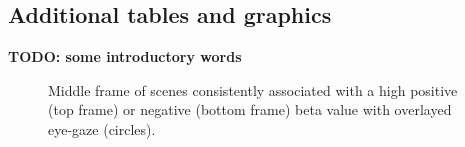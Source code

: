 \documentclass[a4paper, 12pt]{scrreprt}
\begin{document}
\begin{appendices}
	
\chapter{Additional tables and graphics}\label{A:addons}
\textbf{TODO: some introductory words}

\begin{figure}[H]
	\caption[Descriptive analysis of diagnostic scenes]{\small{Middle frame of scenes consistently associated with a high positive (top frame) or negative (bottom frame) beta value with overlayed eye-gaze (circles).}}
	\label{fig:scenes}
\end{figure}
	


\end{appendices}
\end{document}
